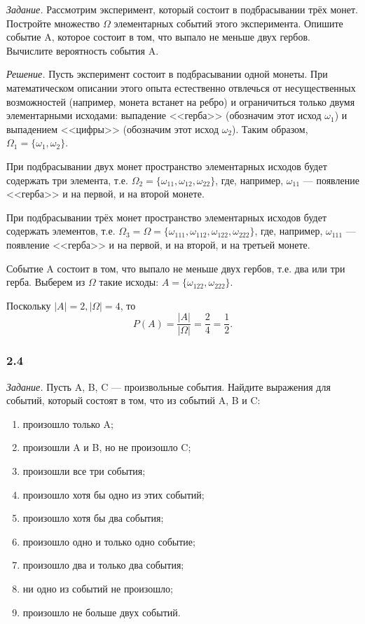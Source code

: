\textit{Задание.} Рассмотрим эксперимент, который состоит в подбрасывании трёх монет.
Постройте множество $ \Omega $ элементарных событий этого эксперимента.
Опишите событие A, которое состоит в том, что выпало не меньше двух гербов.
Вычислите вероятность события A.

\textit{Решение.} Пусть эксперимент состоит в подбрасывании одной монеты.
При математическом описании этого опыта естественно отвлечься от несущественных возможностей
(например, монета встанет на ребро) и ограничиться только двумя элементарными исходами:
выпадение <<герба>> (обозначим этот исход $ \omega_1 $) и выпадением <<цифры>> (обозначим этот исход $\omega_2$).
Таким образом, $ \Omega_1 = \{ \omega_1, \omega_2 \} $.

При подбрасывании двух монет пространство элементарных исходов будет содержать три элемента,
т.е. $ \Omega_2 = \{ \omega_{11}, \omega_{12}, \omega_{22} \} $, где, например, $\omega_{11}$ --- появление <<герба>> и на первой, и на второй монете.

При подбрасывании трёх монет пространство элементарных исходов будет содержать элементов, т.е.
$ \Omega_3 = \Omega = \{ \omega_{111}, \omega_{112}, \omega_{122}, \omega_{222} \} $, где, например,
$ \omega_{111} $ --- появление <<герба>> и на первой, и на второй, и на третьей монете.

Событие A состоит в том, что выпало не меньше двух гербов, т.е. два или три герба.
Выберем из $ \Omega $ такие исходы: $ A = \{ \omega_{122}, \omega_{222} \} $.

Поскольку $ |A| = 2, | \Omega | = 4$, то
$$ P(A) = \frac{ |A| }{| \Omega |} =
\frac{2}{4} =
\frac{1}{2}.$$

\subsubsection*{2.4}

\textit{Задание.} Пусть A, B, C --- произвольные события.
Найдите выражения для событий, который состоят в том, что из событий A, B и C:
\begin{enumerate}[label=\alph*)]
\item произошло только  A;
\item произошли A и B, но не произошло C;
\item произошли все три события;
\item произошло хотя бы одно из этих событий;
\item произошло хотя бы два события;
\item произошло одно и только одно событие;
\item произошло два и только два события;
\item ни одно из событий не произошло;
\item произошло не больше двух событий.
\end{enumerate}


